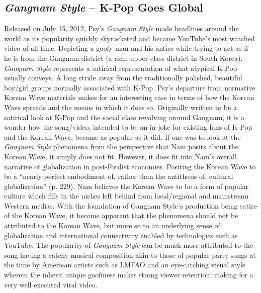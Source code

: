 \documentclass[man,donotrepeattitle,letter]{apa6}
\begin{document}
\subsection{\textit{Gangnam Style} -- K-Pop Goes Global}
Released on July 15, 2012, Psy's \textit{Gangnam Style} made headlines around the world as its popularity quickly skyrocketed and became YouTube's most watched video of all time. Depicting a goofy man and his antics while trying to act as if he is from the Gangnam district (a rich, upper-class district in South Korea), \textit{Gangnam Style} represents a satirical representation of what atypical K-Pop usually conveys.  A long stride away from the traditionally polished, beautiful boy/girl groups normally associated with K-Pop, Psy's departure from normative Korean Wave materials makes for an interesting case in terms of how the Korean Wave spreads and the means in which it does so.  Originally written to be a satirical look at K-Pop and the social class revolving around Gangnam, it is a wonder how the song/video, intended to be an in-joke for existing fans of K-Pop and the Korean Wave, became as popular as it did.  If one was to look at the \textit{Gangnam Style} phenomena from the perspective that Nam posits about the Korean Wave, it simply does not fit. However, it does fit into Nam's overall narrative of globalization in post-Fordist economies. Positing the Korean Wave to be a ``nearly perfect embodiment of, rather than the antithesis of, cultural globalization'' (p. 229), Nam believes the Korean Wave to be a form of popular culture which fills in the niches left behind from local/regional and mainstream Western medias.  With the foundation of Gangnam Style's production being satire of the Korean Wave, it become apparent that the phenomena should not be attributed to the Korean Wave, but more so to an underlying sense of globalization and international connectivity enabled by technologies such as YouTube.  The popularity of \textit{Gangnam Style} can be much more attributed to the song having a catchy musical composition akin to those of popular party songs at the time by American artists such as LMFAO and an eye-catching visual style wherein the inherit unique goofiness makes strong viewer retention; making for a very well executed viral video.
\end{document}
